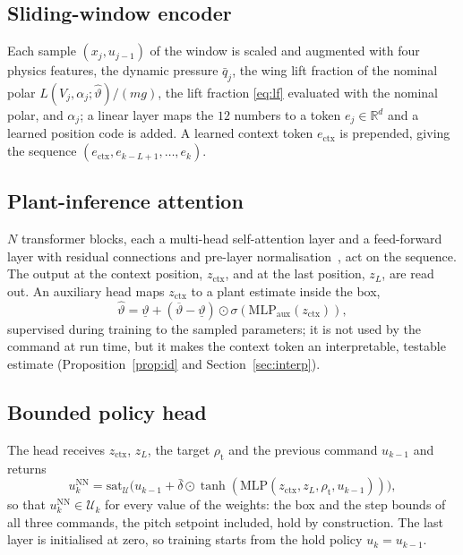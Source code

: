 \documentclass[final,5p,times,twocolumn]{elsarticle}
\begin{document}
\subsection{Sliding-window encoder}
Each sample $(x_j,u_{j-1})$ of the window is scaled and augmented with four physics features, the dynamic pressure $\bar q_j$, the wing lift fraction of the nominal polar $L(V_j,\alpha_j;\hat\vartheta)/(mg)$, the lift fraction \eqref{eq:lf} evaluated with the nominal polar, and $\alpha_j$; a linear layer maps the $12$ numbers to a token $e_j\in\mathbb R^d$ and a learned position code is added. A learned context token $e_{\mathrm{ctx}}$ is prepended, giving the sequence $(e_{\mathrm{ctx}},e_{k-L+1},\dots,e_k)$.

\subsection{Plant-inference attention}
$N$ transformer blocks, each a multi-head self-attention layer and a feed-forward layer with residual connections and pre-layer normalisation~\cite{Vaswani2017}, act on the sequence. The output at the context position, $z_{\mathrm{ctx}}$, and at the last position, $z_L$, are read out. An auxiliary head maps $z_{\mathrm{ctx}}$ to a plant estimate inside the box,
\begin{equation}\label{eq:aux}
\hat\vartheta=\underline\vartheta+(\overline\vartheta-\underline\vartheta)\odot\sigma(\mathrm{MLP}_{\mathrm{aux}}(z_{\mathrm{ctx}})),
\end{equation}
supervised during training to the sampled parameters; it is not used by the command at run time, but it makes the context token an interpretable, testable estimate (Proposition~\ref{prop:id} and Section~\ref{sec:interp}).

\subsection{Bounded policy head}
The head receives $z_{\mathrm{ctx}}$, $z_L$, the target $\rho_{\mathrm t}$ and the previous command $u_{k-1}$ and returns
\begin{equation}\label{eq:bph}
u^{\mathrm{NN}}_k=\mathrm{sat}_{\mathcal U}\big(u_{k-1}+\bar\delta\odot\tanh(\mathrm{MLP}(z_{\mathrm{ctx}},z_L,\rho_{\mathrm t},u_{k-1}))\big),
\end{equation}
so that $u^{\mathrm{NN}}_k\in\mathcal U_k$ for every value of the weights: the box and the step bounds of all three commands, the pitch setpoint included, hold by construction. The last layer is initialised at zero, so training starts from the hold policy $u_k=u_{k-1}$.
\end{document}
